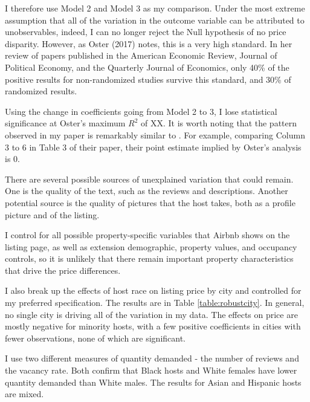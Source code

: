
I therefore use Model 2 and Model 3 as my comparison. Under the most extreme assumption that all of the variation in the outcome variable can be attributed to unobservables, indeed, I can no longer reject the Null hypothesis of no price disparity. However, as Oster (2017) notes, this is a very high standard. In her review of papers published in the American Economic Review, Journal of Political Economy, and the Quarterly Journal of Economics, only 40\% of the positive results for non-randomized studies survive this standard, and 30\% of randomized results. 

Using the change in coefficients going from Model 2 to 3, I lose statistical significance at Oster’s maximum $R^2$ of XX. It is worth noting that the pattern observed in my paper is remarkably similar to \cite{kakar}. For example, comparing Column 3 to 6 in Table 3 of their paper, their point estimate implied by Oster's analysis is 0. 






There are several possible sources of unexplained variation that could remain. One is the quality of the text, such as the reviews and descriptions. Another potential source is the quality of pictures that the host takes, both as a profile picture and of the listing. 

I control for all possible property-specific variables that Airbnb shows on the listing page, as well as extension demographic, property values, and occupancy controls, so it is unlikely that there remain important property characteristics that drive the price differences. 











I also break up the effects of host race on listing price by city and controlled for my preferred specification. The results are in Table \ref{table:robustcity}. In general, no single city is driving all of the variation in my data. The effects on price are mostly negative for minority hosts, with a few positive coefficients in cities with fewer observations, none of which are significant. 

I use two different measures of quantity demanded - the number of reviews and the vacancy rate. Both confirm that Black hosts and White females have lower quantity demanded than White males. The results for Asian and Hispanic hosts are mixed. 

